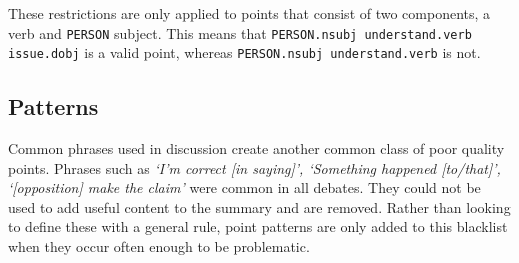       These restrictions are only applied to points that consist of two components, a verb and \texttt{PERSON} subject. This means that \texttt{PERSON.nsubj understand.verb issue.dobj} is a valid point, whereas \texttt{PERSON.nsubj understand.verb} is not.

    \tocless\subsection{Patterns}
      Common phrases used in discussion create another common class of poor quality points. Phrases such as \textit{`I'm correct [in saying]', `Something happened [to/that]', `[opposition] make the claim'} were common in all debates. They could not be used to add useful content to the summary and are removed. Rather than looking to define these with a general rule, point patterns are only added to this blacklist when they occur often enough to be problematic.
